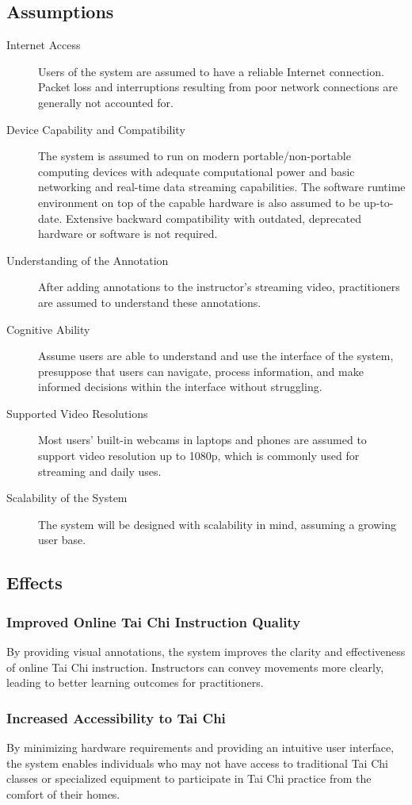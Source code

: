\documentclass[12pt]{article}
\begin{document}
\subsection{Assumptions}
\begin{description}
    \item[Internet Access] Users of the system are assumed to have a reliable Internet connection. Packet loss and interruptions resulting from poor network connections are generally not accounted for.
    \item[Device Capability and Compatibility] The system is assumed to run on modern portable/non-portable computing devices with adequate computational power and basic networking and real-time data streaming capabilities. The software runtime environment on top of the capable hardware is also assumed to be up-to-date. Extensive backward compatibility with outdated, deprecated hardware or software is not required.
    \item[Understanding of the Annotation] After adding annotations to the instructor’s streaming video, practitioners are assumed to understand these annotations.
    \item[Cognitive Ability] Assume users are able to understand and use the interface of the system, presuppose that users can navigate, process information, and make informed decisions within the interface without struggling.
    \item[Supported Video Resolutions] Most users’ built-in webcams in laptops and phones are assumed to support video resolution up to 1080p, which is commonly used for streaming and daily uses.
    \item[Scalability of the System] The system will be designed with scalability in mind, assuming a growing user base.
\end{description}

\subsection{Effects}
\subsubsection{Improved Online Tai Chi Instruction Quality}
By providing visual annotations, the system improves the clarity and effectiveness of online Tai Chi instruction. Instructors can convey movements more clearly, leading to better learning outcomes for practitioners.
\subsubsection{Increased Accessibility to Tai Chi}
By minimizing hardware requirements and providing an intuitive user interface, the system enables individuals who may not have access to traditional Tai Chi classes or specialized equipment to participate in Tai Chi practice from the comfort of their homes.
\end{document}
